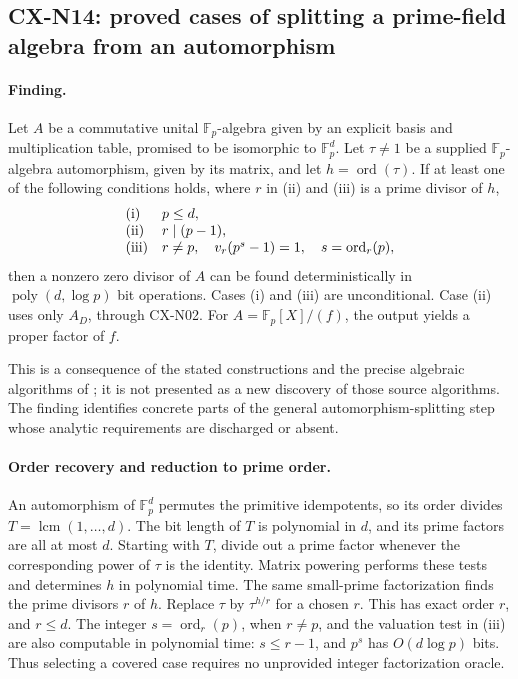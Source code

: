 \subsection{CX-N14: proved cases of splitting a prime-field algebra from an automorphism}
\label{finding:CX-N14}

\paragraph{Finding.}
Let \(A\) be a commutative unital \(\mathbb F_p\)-algebra
given by an explicit basis and multiplication table, promised to
be isomorphic to \(\mathbb F_p^d\).
Let \(\tau\ne1\) be a supplied \(\mathbb F_p\)-algebra automorphism,
given by its matrix, and let \(h=\operatorname{ord}(\tau)\).
If at least one of the following conditions holds, where
\(r\) in (ii) and (iii) is a prime divisor of \(h\),
\[
\begin{array}{ll}
\textnormal{(i)} & p\leq d,\\
\textnormal{(ii)} & r\mid(p-1),\\
\textnormal{(iii)} & r\ne p,\quad
 v_r\!\left(p^{s}-1\right)=1,\quad s=\operatorname{ord}_r(p),
\end{array}
\]
then a nonzero zero divisor of \(A\) can be found deterministically
in \(\operatorname{poly}(d,\log p)\) bit operations.
Cases (i) and (iii) are unconditional.
Case (ii) uses only \(A_D\), through CX-N02.
For \(A=\mathbb F_p[X]/(f)\), the output yields a proper factor of
\(f\).

This is a consequence of the stated constructions and the precise
algebraic algorithms of
\cite[Lemma~4.2 and Proposition~4.6]{CXNIKRS08};
it is not presented as a new discovery of those source algorithms.
The finding identifies concrete parts of the general
automorphism-splitting step whose analytic requirements are
discharged or absent.

\paragraph{Order recovery and reduction to prime order.}
An automorphism of \(\mathbb F_p^d\) permutes the primitive
idempotents, so its order divides
\(T=\operatorname{lcm}(1,\ldots,d)\).
The bit length of \(T\) is polynomial in \(d\), and its prime factors
are all at most \(d\).
Starting with \(T\), divide out a prime factor whenever the
corresponding power of \(\tau\) is the identity.
Matrix powering performs these tests and determines \(h\) in
polynomial time.
The same small-prime factorization finds the prime divisors \(r\)
of \(h\).
Replace \(\tau\) by \(\tau^{h/r}\) for a chosen \(r\).
This has exact order \(r\), and \(r\leq d\).
The integer \(s=\operatorname{ord}_r(p)\), when \(r\ne p\), and
the valuation test in (iii) are also computable in polynomial
time: \(s\leq r-1\), and \(p^s\) has \(O(d\log p)\) bits.
Thus selecting a covered case requires no unprovided integer
factorization oracle.

